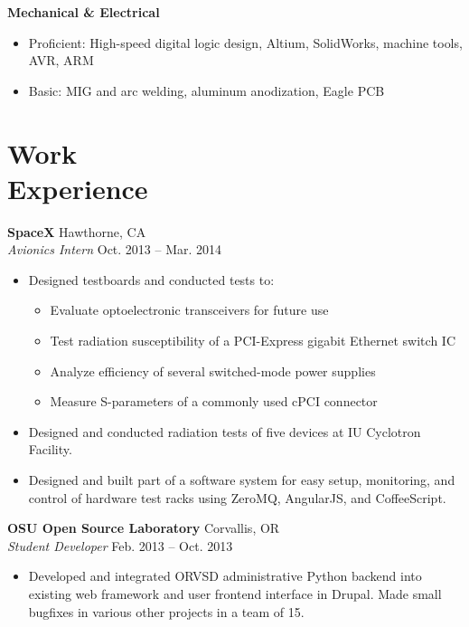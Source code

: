 \documentclass[10pt,letterpaper,margin]{res}
\begin{document}
\begin{resume}
{\bf Mechanical \& Electrical}\vspace{0.2em}

\begin{itemize}
	\item Proficient: High-speed digital logic design, Altium, SolidWorks, machine tools, AVR, ARM
	\item Basic: \hspace{17pt} MIG and arc welding, aluminum anodization, Eagle PCB
\end{itemize}



\section{Work \\ Experience}

{\bf SpaceX} \hfill {\color{lightgray} Hawthorne, CA} \\
{\it Avionics Intern} \hfill {\color{lightgray} Oct. 2013 -- Mar. 2014}\vspace{0.2em}

\begin{itemize}
	\item Designed testboards and conducted tests to:
		\begin{itemize}
			\item Evaluate optoelectronic transceivers for future use
			\item Test radiation susceptibility of a PCI-Express gigabit Ethernet switch IC
			\item Analyze efficiency of several switched-mode power supplies
			\item Measure S-parameters of a commonly used cPCI connector
		\end{itemize}
	\item Designed and conducted radiation tests of five devices at IU
		Cyclotron Facility.
	\item Designed and built part of a software system for easy setup,
		monitoring, and control of hardware test racks using ZeroMQ, AngularJS,
		and CoffeeScript.
\end{itemize}


{\bf OSU Open Source Laboratory} \hfill {\color{lightgray} Corvallis, OR} \\
{\it Student Developer} \hfill {\color{lightgray} Feb. 2013 -- Oct. 2013}\vspace{0.2em}

\begin{itemize}
	\item Developed and integrated ORVSD administrative Python backend into
		existing web framework and user frontend interface in Drupal. Made
		small bugfixes in various other projects in a team of 15.
\end{itemize}



\end{resume}
\end{document}
